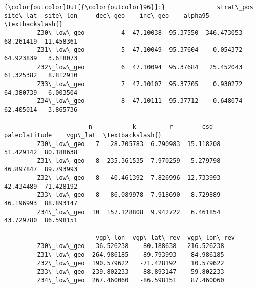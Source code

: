 \documentclass[11pt]{article}
\begin{document}
            \begin{Verbatim}[commandchars=\\\{\}]
{\color{outcolor}Out[{\color{outcolor}96}]:}              strat\_pos  site\_lat  site\_lon     dec\_geo    inc\_geo    alpha95  \textbackslash{}
         Z30\_low\_geo          4  47.10038  95.37550  346.473053  68.261419  11.458361   
         Z31\_low\_geo          5  47.10049  95.37604    0.054372  64.923839   3.618073   
         Z32\_low\_geo          6  47.10094  95.37684   25.452043  61.325382   8.812910   
         Z33\_low\_geo          7  47.10107  95.37705    0.930272  64.380739   6.003504   
         Z34\_low\_geo          8  47.10111  95.37712    0.648074  62.405014   3.865736   
         
                       n           k         r        csd  paleolatitude    vgp\_lat  \textbackslash{}
         Z30\_low\_geo   7   28.705783  6.790983  15.118208      51.429142  80.188638   
         Z31\_low\_geo   8  235.361535  7.970259   5.279798      46.897847  89.793993   
         Z32\_low\_geo   8   40.461392  7.826996  12.733993      42.434489  71.428192   
         Z33\_low\_geo   8   86.089978  7.918690   8.729889      46.196993  88.893147   
         Z34\_low\_geo  10  157.128808  9.942722   6.461854      43.729780  86.598151   
         
                         vgp\_lon  vgp\_lat\_rev  vgp\_lon\_rev  
         Z30\_low\_geo   36.526238   -80.188638   216.526238  
         Z31\_low\_geo  264.986185   -89.793993    84.986185  
         Z32\_low\_geo  190.579622   -71.428192    10.579622  
         Z33\_low\_geo  239.802233   -88.893147    59.802233  
         Z34\_low\_geo  267.460060   -86.598151    87.460060  
\end{Verbatim}
        
\end{document}
